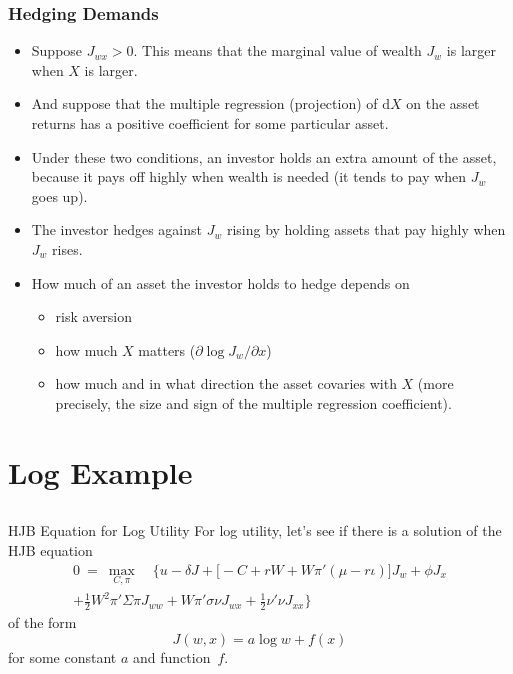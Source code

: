 \documentclass[10pt]{beamer}
\newcommand{\bi}{\begin{itemize}}
\newcommand{\ei}{\end{itemize}}
\newcommand{\im}{\item}
\newcommand{\D}{\mathrm{d}}
\newcommand{\bfr}{\begin{frame}}
\begin{document}
\bfr\frametitle{Hedging Demands}
\bi
\im Suppose $J_{wx}>0$.  This means that the marginal value of wealth $J_w$ is larger when $X$ is larger.
\im And suppose that the multiple regression (projection) of $\D X$ on the asset returns has a positive coefficient for some particular asset.  
\im Under these two conditions, an investor holds an extra amount of the asset, because it pays off highly when wealth is needed (it tends to pay when $J_w$ goes up).
\im The investor hedges against $J_w$ rising by holding assets that pay highly when $J_w$ rises.
\im How much of an asset the investor holds to hedge depends on
\bi
\im risk aversion
\im how much $X$ matters ($\partial \log J_w/\partial x$)
\im how much and in what direction the asset covaries with $X$ (more precisely, the size and sign of the multiple regression coefficient).
\ei
\ei
\end{frame}

\section{Log Example}\subsection{}


\begin{frame}{HJB Equation for Log Utility}
For log utility, let's see if there is a solution of the HJB equation 
\begin{multline*} 0 \ = \ \max_{C,\pi} \quad \bigg\{u - \delta J + \big[-C + rW + W\pi'(\mu - r\iota)\big]J_w + \phi J_x \\
+ \frac{1}{2}W^2\pi'\Sigma\pi J_{ww} + W\pi'\sigma\nu J_{wx} 
+ \frac{1}{2}\nu'\nu J_{xx} \bigg\}
\end{multline*}
of the form 
$$J(w,x) = a \log w + f(x)$$
for some constant $a$ and function~$f$.
\end{frame}

\end{document}

